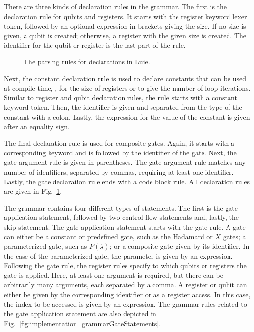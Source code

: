 There are three kinds of declaration rules in the grammar. The first is the declaration rule for qubits and registers. It starts with the register keyword lexer token, followed by an optional expression in brackets giving the size. If no size is given, a qubit is created; otherwise, a register with the given size is created. The identifier for the qubit or register is the last part of the rule.

\begin{figure}[htp]
    \centering
    
    \caption{The parsing rules for declarations in Luie.}
    \label{fig:implementation_grammarDeclarations}
\end{figure}

Next, the constant declaration rule is used to declare constants that can be used at compile time, \eg, for the size of registers or to give the number of loop iterations. Similar to register and qubit declaration rules, the rule starts with a constant keyword token. Then, the identifier is given and separated from the type of the constant with a colon. Lastly, the expression for the value of the constant is given after an equality sign.

The final declaration rule is used for composite gates. Again, it starts with a corresponding keyword and is followed by the identifier of the gate. Next, the gate argument rule is given in parentheses. The gate argument rule matches any number of identifiers, separated by commas, requiring at least one identifier. Lastly, the gate declaration rule ends with a code block rule.
All declaration rules are given in Fig.~\ref{fig:implementation_grammarDeclarations}. 

The grammar contains four different types of statements. The first is the gate application statement, followed by two control flow statements and, lastly, the skip statement. The gate application statement starts with the gate rule. A gate can either be a constant or predefined gate, such as the Hadamard or $X$ gates; a parameterized gate, such as $P(\lambda)$; or a composite gate given by its identifier. In the case of the parameterized gate, the parameter is given by an expression. Following the gate rule, the register rules specify to which qubits or registers the gate is applied. Here, at least one argument is required, but there can be arbitrarily many arguments, each separated by a comma. A register or qubit can either be given by the corresponding identifier or as a register access. In this case, the index to be accessed is given by an expression. The grammar rules related to the gate application statement are also depicted in Fig.~\ref{fig:implementation_grammarGateStatements}.

